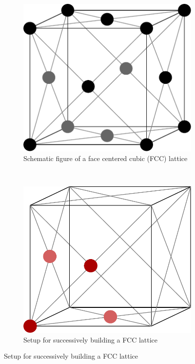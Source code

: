 \documentclass[12pt]{article}
\begin{document}
\begin{figure}[h]
    \begin{center}
        \begin{subfigure}[t]{0.4\textwidth}
            \includegraphics[scale=0.3]{images/fcc-2.pdf}
            \caption{Schematic figure of a face centered cubic (FCC) lattice}
            \label{fig:fcc}
        \end{subfigure} 
        \
        \begin{subfigure}[t]{0.4\textwidth}
            \includegraphics[scale=0.3]{images/unit_cell.pdf}
            \caption{Setup for successively building a FCC lattice}
            \label{fig:unitcell}
        \end{subfigure}
    \end{center}
\end{figure}
\end{document}
